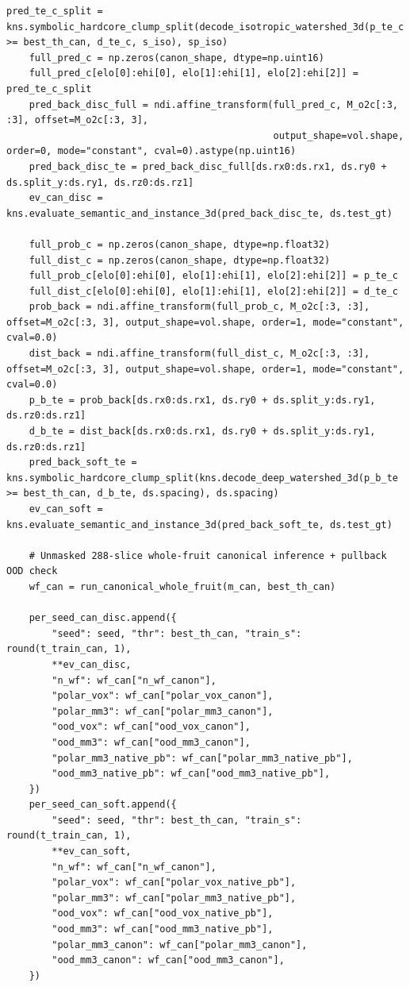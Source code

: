 \documentclass[10pt,a4paper]{article}
\renewcommand{\_}{\origunderscore\allowbreak}
\begin{document}
\begin{codebox}
\begin{lstlisting}[style=pybmed]
    pred_te_c_split = kns.symbolic_hardcore_clump_split(decode_isotropic_watershed_3d(p_te_c >= best_th_can, d_te_c, s_iso), sp_iso)
    full_pred_c = np.zeros(canon_shape, dtype=np.uint16)
    full_pred_c[elo[0]:ehi[0], elo[1]:ehi[1], elo[2]:ehi[2]] = pred_te_c_split
    pred_back_disc_full = ndi.affine_transform(full_pred_c, M_o2c[:3, :3], offset=M_o2c[:3, 3],
                                               output_shape=vol.shape, order=0, mode="constant", cval=0).astype(np.uint16)
    pred_back_disc_te = pred_back_disc_full[ds.rx0:ds.rx1, ds.ry0 + ds.split_y:ds.ry1, ds.rz0:ds.rz1]
    ev_can_disc = kns.evaluate_semantic_and_instance_3d(pred_back_disc_te, ds.test_gt)

    full_prob_c = np.zeros(canon_shape, dtype=np.float32)
    full_dist_c = np.zeros(canon_shape, dtype=np.float32)
    full_prob_c[elo[0]:ehi[0], elo[1]:ehi[1], elo[2]:ehi[2]] = p_te_c
    full_dist_c[elo[0]:ehi[0], elo[1]:ehi[1], elo[2]:ehi[2]] = d_te_c
    prob_back = ndi.affine_transform(full_prob_c, M_o2c[:3, :3], offset=M_o2c[:3, 3], output_shape=vol.shape, order=1, mode="constant", cval=0.0)
    dist_back = ndi.affine_transform(full_dist_c, M_o2c[:3, :3], offset=M_o2c[:3, 3], output_shape=vol.shape, order=1, mode="constant", cval=0.0)
    p_b_te = prob_back[ds.rx0:ds.rx1, ds.ry0 + ds.split_y:ds.ry1, ds.rz0:ds.rz1]
    d_b_te = dist_back[ds.rx0:ds.rx1, ds.ry0 + ds.split_y:ds.ry1, ds.rz0:ds.rz1]
    pred_back_soft_te = kns.symbolic_hardcore_clump_split(kns.decode_deep_watershed_3d(p_b_te >= best_th_can, d_b_te, ds.spacing), ds.spacing)
    ev_can_soft = kns.evaluate_semantic_and_instance_3d(pred_back_soft_te, ds.test_gt)

    # Unmasked 288-slice whole-fruit canonical inference + pullback OOD check
    wf_can = run_canonical_whole_fruit(m_can, best_th_can)

    per_seed_can_disc.append({
        "seed": seed, "thr": best_th_can, "train_s": round(t_train_can, 1),
        **ev_can_disc,
        "n_wf": wf_can["n_wf_canon"],
        "polar_vox": wf_can["polar_vox_canon"],
        "polar_mm3": wf_can["polar_mm3_canon"],
        "ood_vox": wf_can["ood_vox_canon"],
        "ood_mm3": wf_can["ood_mm3_canon"],
        "polar_mm3_native_pb": wf_can["polar_mm3_native_pb"],
        "ood_mm3_native_pb": wf_can["ood_mm3_native_pb"],
    })
    per_seed_can_soft.append({
        "seed": seed, "thr": best_th_can, "train_s": round(t_train_can, 1),
        **ev_can_soft,
        "n_wf": wf_can["n_wf_canon"],
        "polar_vox": wf_can["polar_vox_native_pb"],
        "polar_mm3": wf_can["polar_mm3_native_pb"],
        "ood_vox": wf_can["ood_vox_native_pb"],
        "ood_mm3": wf_can["ood_mm3_native_pb"],
        "polar_mm3_canon": wf_can["polar_mm3_canon"],
        "ood_mm3_canon": wf_can["ood_mm3_canon"],
    })


\end{lstlisting}
\end{codebox}
\end{document}
